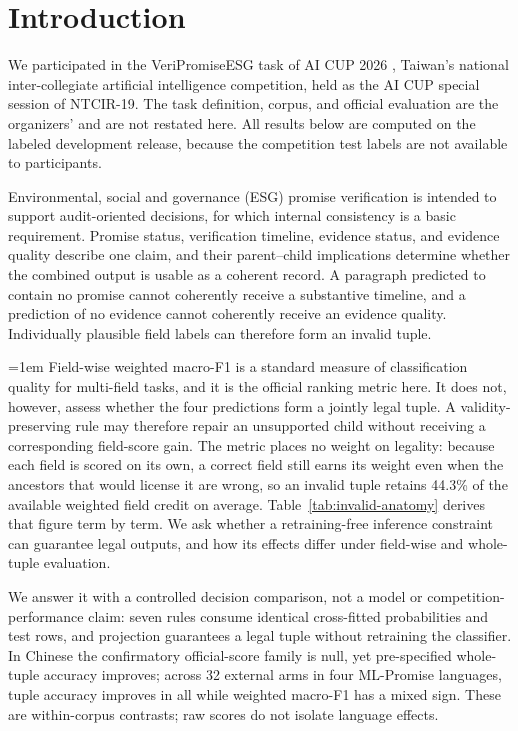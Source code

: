 \section{Introduction}

We participated in the VeriPromiseESG task of AI CUP 2026
\cite{aicup2026guidelines,day2026veripromiseesg4k}, Taiwan's national
inter-collegiate artificial intelligence competition, held as the AI CUP
special session of NTCIR-19. The task definition, corpus, and official
evaluation are the organizers' and are not restated here. All results below are computed on the
labeled development release, because the competition test labels are not
available to participants.

Environmental, social and governance (ESG) promise verification is intended to
support audit-oriented decisions, for which internal consistency is a basic
requirement. Promise status,
verification timeline, evidence status, and evidence quality describe one
claim, and their parent--child implications determine whether the combined
output is usable as a coherent record. A paragraph predicted to contain no
promise cannot coherently receive a substantive timeline, and a prediction of
no evidence cannot coherently receive an evidence quality. Individually
plausible field labels can therefore form an invalid tuple.

\begingroup\emergencystretch=1em
Field-wise weighted macro-F1 is a standard measure of classification quality
for multi-field tasks, and it is the official ranking metric here. It does not,
however, assess whether the four predictions form a jointly legal tuple. A
validity-preserving rule may therefore repair an unsupported child without
receiving a corresponding field-score gain. The metric places no weight on
legality: because each field is scored on its own, a correct field still earns its weight even
when the ancestors that would license it are wrong, so an invalid tuple retains
44.3\% of the available weighted field credit on average.
Table~\ref{tab:invalid-anatomy} derives that figure term by term. We ask
whether a retraining-free inference constraint can guarantee legal outputs, and
how its effects differ under field-wise and whole-tuple evaluation.
\par\endgroup

We answer it with a controlled decision comparison, not a model or
competition-performance claim: seven rules consume identical cross-fitted
probabilities and test rows, and projection guarantees a legal tuple without
retraining the classifier. In Chinese the confirmatory official-score family is
null, yet pre-specified whole-tuple accuracy improves; across 32 external arms
in four ML-Promise languages, tuple accuracy improves in all while weighted
macro-F1 has a mixed sign. These are within-corpus contrasts; raw scores do not
isolate language effects.

